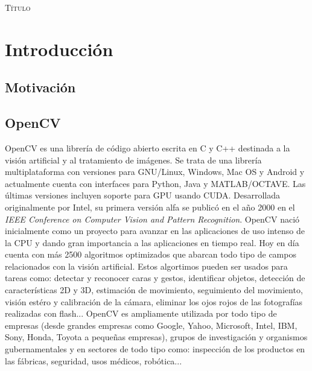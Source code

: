 \documentclass[a4paper,openright, 12pt]{book}
\begin{document}
\begin{titlepage}
\begin{center}
\begin{Huge}
\textsc{Título}
\end{Huge}
\end{center}
\end{titlepage}

\newpage
\mbox{}
\thispagestyle{empty} 


\tableofcontents %
\thispagestyle{empty}


\chapter{Introducción}\label{cap.introduccion}

\section{Motivación}


\section{OpenCV}

OpenCV es una librería de código abierto escrita en C y C++ destinada a la visión artificial y al tratamiento de imágenes. Se trata de una librería multiplataforma con versiones para GNU/Linux, Windows, Mac OS y Android y actualmente cuenta con interfaces para Python, Java y MATLAB/OCTAVE. Las últimas versiones incluyen soporte para GPU usando CUDA.
Desarrollada originalmente por Intel, su primera versión alfa se publicó en el año 2000 en el \textit{IEEE Conference on Computer Vision and Pattern Recognition}. OpenCV nació inicialmente como un proyecto para avanzar en las aplicaciones de uso intenso de la CPU y dando gran importancia a las aplicaciones en tiempo real. Hoy en día cuenta con más 2500 algoritmos optimizados que abarcan todo tipo de campos relacionados con la visión artificial.
Estos algortimos pueden ser usados para tareas como: detectar y reconocer caras y gestos, identificar objetos, detección de características 2D y 3D, estimación de movimiento, seguimiento del movimiento, visión estéro y calibración de la cámara, eliminar los ojos rojos de las fotografías realizadas con flash...
\newline
OpenCV es ampliamente utilizada por todo tipo de empresas (desde grandes empresas como Google, Yahoo, Microsoft, Intel, IBM, Sony, Honda, Toyota a pequeñas empresas), grupos de investigación y organismos gubernamentales y en sectores de todo tipo como: inspección de los productos en las fábricas, seguridad, usos médicos, robótica...
\newline
\end{document}
